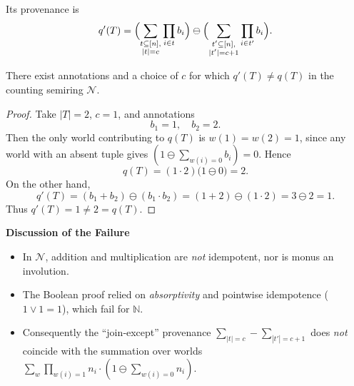 Its provenance is
\[
  q'(T)
  =
  \Bigl(\sum_{\substack{t\subseteq[n],\\|t|=c}}\prod_{i\in t}b_i\Bigr)
  \ominus
  \Bigl(\sum_{\substack{t'\subseteq[n],\\|t'|=c+1}}\prod_{i\in t'}b_i\Bigr).
\]

\begin{proposition}
There exist annotations and a choice of \(c\) for which
\(q'(T)\neq q(T)\)
in the counting semiring \(\mathcal{N}\).
\end{proposition}

\begin{proof}
Take \(\lvert T\rvert=2\), \(c=1\), and annotations
\[
  b_1 = 1,\quad b_2 = 2.
\]
Then the only world contributing to \(q(T)\) is \(w(1)=w(2)=1\), since any world with an absent tuple gives
\((1\ominus\sum_{w(i)=0}b_i)=0\).  Hence
\[
  q(T)
  = (1\cdot2)\bigl(1\ominus0\bigr)
  = 2.
\]
On the other hand,
\[
  q'(T)
  = (b_1+b_2)\ominus(b_1\cdot b_2)
  = (1+2)\ominus(1\cdot2)
  = 3\ominus2
  = 1.
\]
Thus \(q'(T)=1\neq2=q(T)\).
\end{proof}

\bigskip
\noindent\textbf{Discussion of the Failure}

\begin{itemize}
  \item In \(\mathcal{N}\), addition and multiplication are \emph{not} idempotent, nor is monus an involution.
  \item The Boolean proof relied on \emph{absorptivity} and pointwise idempotence (\(1\vee1=1\)), which fail for \(\mathbb{N}\).
  \item Consequently the “join‐except” provenance
    \(\sum_{|t|=c}-\sum_{|t'|=c+1}\)
    does \emph{not} coincide with the summation over worlds
    \(\sum_{w}\prod_{w(i)=1}n_i\cdot(1\ominus\sum_{w(i)=0}n_i)\).
\end{itemize}




